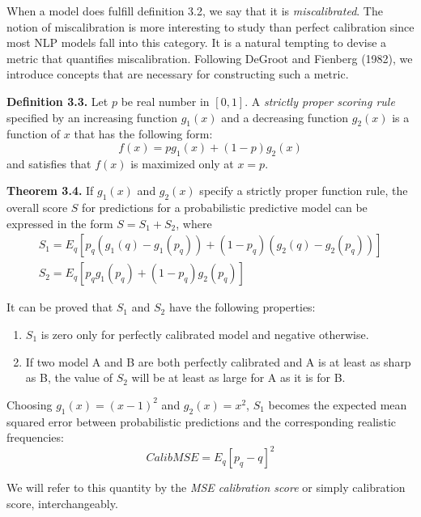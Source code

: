 When a model does fulfill definition 3.2, we say that it is \textit{miscalibrated}. The notion of miscalibration is more interesting to study than perfect calibration since most NLP models fall into this category. It is a natural tempting to devise a metric that quantifies miscalibration. Following DeGroot and Fienberg (1982), we introduce concepts that are necessary for constructing such a metric.

\textbf{Definition 3.3.} Let $p$ be real number in $[0, 1]$. A \textit{strictly proper scoring rule} specified by an increasing function $g_1(x)$ and a decreasing function $g_2(x)$ is a function of $x$ that has the following form:
\begin{equation}
    \displaystyle f(x) = pg_1(x) + (1 - p)g_2(x)
    \label{eqn:proper_rule}
\end{equation}
and satisfies that $f(x)$ is maximized only at $x = p$.

\textbf{Theorem 3.4.} If $g_1(x)$ and $g_2(x)$ specify a strictly proper function rule, the overall score $S$ for predictions for a probabilistic predictive model can be expressed in the form $S = S_1 + S_2$, where
\begin{equation}    
  \begin{array}{l}
    S_1 = E_{q}\left[p_q\left(g_1(q) - g_1(p_q)\right) + \left(1 - p_q\right)\left(g_2(q) - g_2(p_q)\right)\right] \\ 
    S_2 = E_{q}\left[p_qg_1(p_q) + \left(1 - p_q\right)g_2(p_q)\right]
  \end{array}
  \label{eqn:general_metric}
\end{equation}

It can be proved that $S_1$ and $S_2$ have the following properties: 
\begin{enumerate}
  \item $S_1$ is zero only for perfectly calibrated model and negative otherwise.
  \item If two model A and B are both perfectly calibrated and A is at least as sharp as B, the value of $S_2$ will be at least as large for A as it is for B.
\end{enumerate}

Choosing $g_1(x) = (x - 1)^2$ and $g_2(x) = x^2$, $S_1$ becomes the expected mean squared error between probabilistic predictions and the corresponding realistic frequencies:
$$CalibMSE = E_{q}[p_q - q]^2$$

We will refer to this quantity by the \textit{MSE calibration score} or simply calibration score, interchangeably. 

